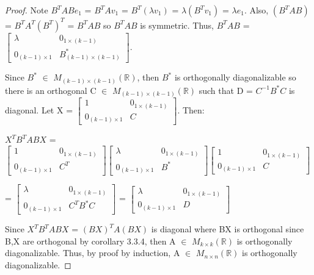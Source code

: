 \begin{proof}
        Note $B^TABe_1$
        = $B^TAv_1$
        = $B^T (\lambda v_1)$
        = $\lambda (B^Tv_1)$
        = $\lambda e_1$.
        Also, $(B^TAB)$ = $B^TA^T(B^T)^T$ = $B^TAB$ so $B^TAB$ is symmetric.
        Thus,
        $B^TAB$ =
        $\begin{bmatrix}
            \lambda & 0_{1 \times (k-1)} \\
            0_{(k-1) \times 1} & B^*_{(k-1) \times (k-1)}
        \end{bmatrix}$.

        Since $B^*$ $\in$ $M_{(k-1) \times (k-1)}(\mathbb{R})$,
        then $B^*$ is orthogonally diagonalizable so there is an orthogonal
        C $\in$ $M_{(k-1) \times (k-1)}(\mathbb{R})$ such that
        D = $C^{-1}B^*C$ is diagonal.
        Let X = $\begin{bmatrix}
            1 & 0_{1 \times (k-1)} \\
            0_{(k-1) \times 1} & C
        \end{bmatrix}$. Then:

        \hspace{0.5cm}
        $X^T B^T A B X$ =
        $\begin{bmatrix}
            1 & 0_{1 \times (k-1)} \\
            0_{(k-1) \times 1} & C^T
        \end{bmatrix}
        \begin{bmatrix}
            \lambda & 0_{1 \times (k-1)} \\
            0_{(k-1) \times 1} & B^*
        \end{bmatrix}
        \begin{bmatrix}
            1 & 0_{1 \times (k-1)} \\
            0_{(k-1) \times 1} & C
        \end{bmatrix}$

        \hspace{2.7cm}
        =
        $\begin{bmatrix}
            \lambda & 0_{1 \times (k-1)} \\
            0_{(k-1) \times 1} & C^TB^*C
        \end{bmatrix}$ =
        $\begin{bmatrix}
            \lambda & 0_{1 \times (k-1)} \\
            0_{(k-1) \times 1} & D
        \end{bmatrix}$

        Since $X^T B^T A B X$ = $(BX)^T A (BX)$ is diagonal
        where BX is orthogonal since B,X are orthogonal
        by {\color{orange} corollary 3.3.4}, then
        A $\in$ $M_{k \times k}(\mathbb{R})$ is orthogonally diagonalizable.
        Thus, by proof by induction, A $\in$ $M_{n \times n}(\mathbb{R})$
        is orthogonally diagonalizable.
    \end{proof}

